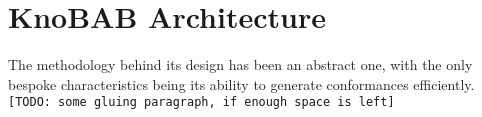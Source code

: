 \section{KnoBAB Architecture}\label{sec:karch}
The methodology behind its design has been an abstract one, with the only bespoke characteristics being its ability to generate conformances efficiently. \texttt{\color{red}[TODO: some gluing paragraph, if enough space is left]}

